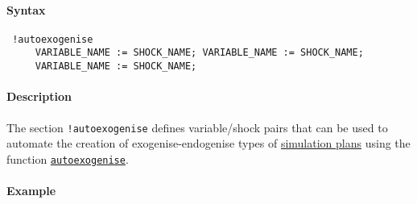 


	\paragraph{Syntax}
 
 \begin{verbatim}
 !autoexogenise
     VARIABLE_NAME := SHOCK_NAME; VARIABLE_NAME := SHOCK_NAME;
     VARIABLE_NAME := SHOCK_NAME;
 \end{verbatim}
 
 \paragraph{Description}
 
 The section \texttt{!autoexogenise} defines variable/shock pairs that
 can be used to automate the creation of exogenise-endogenise types of
 \href{plan/Contents}{simulation plans} using the function
 \href{plan/autoexogenise}{\texttt{autoexogenise}}.
 
 \paragraph{Example}


